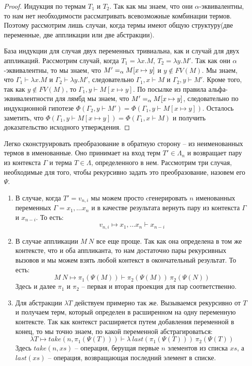 \begin{proof}
  Индукция по термам $T_{1}$ и $T_{2}$. Так как мы знаем, что они $\alpha$-эквивалентны, то нам нет необходимости рассматривать всевозможные комбинации термов. Поэтому рассмотрим лишь случаи, когда термы имеют общую структуру(две переменные, две аппликации или две абстракции).

  База индукции для случая двух переменных тривиальна, как и случай для двух аппликаций. Рассмотрим случай, когда $T_{1} = \lambda x.M$, $T_{2} = \lambda y.M'$. Так как они $\alpha$-эквивалентны, то мы знаем, что $M' =_{\alpha} M[x \mapsto y]$ и $y \notin FV(M)$. Мы знаем, что $\Gamma_{1} \vdash \lambda x.M$ и $\Gamma_{2} \vdash \lambda y.M'$, следовательно $\Gamma_{1}, x \vdash M$ и $\Gamma_{2}, y \vdash M'$. Кроме того, так как $y \notin FV(M)$, то $\Gamma_{1}, y \vdash M[x \mapsto y]$. По посылке из правила альфа-эквивалентности для лямбд мы знаем, что $M' =_{\alpha} M[x \mapsto y]$, следовательно по индукционной гипотезе $\Phi(\Gamma_{2}, y \vdash M') = \Phi(\Gamma_{1}, y \vdash M[x \mapsto y])$. Осталось заметить, что $\Phi(\Gamma_{1}, y \vdash M[x \mapsto y]) = \Phi(\Gamma_{1}, x \vdash M)$ и получить доказательство исходного утверждения.
\end{proof}

Легко сконструировать преобразование в обратную сторону -- из неименованных термов в именованные. Оно принимает на вход терм $T' \in \Lambda_{n}$ и возвращает пару из контекста $\Gamma$ и терма $T \in \Lambda$, определенного в нем. Рассмотрим три случая, необходимые для того, чтобы рекурсивно задать это преобразование, назовем его $\Psi$.

\begin{enumerate}
  \item В случае, когда $T' = v_{n, i}$ мы можем просто cгенерировать $n$ именованных переменных $\Gamma = x_{1}, \dots x_{n}$ и в качестве результата вернуть пару из контекста $\Gamma$ и $x_{n - i}$. То есть:
  $$ v_{n, i} \mapsto x_{1}, \dots x_{n} \vdash x_{n-i} $$

  \item В случае аппликации $M\ N$ все еще проще. Так как она определена в том же контексте, что и оба аппликанта, то нам достаточно пары рекурсивных вызовов и мы можем взять любой контекст в окончательный результат. То есть:
  $$ M\ N \mapsto \pi_{1}(\Psi(M)) \vdash \pi_{2}(\Psi(M))\ \pi_{2}(\Psi(N))$$
  Здесь и далее $\pi_{1}$ и $\pi_{2}$ -- первая и вторая проекция для пар соответственно.

  \item Для абстракции $\lambda T$ действуем примерно так же. Вызываемся рекурсивно от $T$ и получаем терм, который определен в расширенном на одну переменную контексте. Так как контекст расширяется путем добавления переменной в конец, то мы точно знаем, по какой переменной абстрагироваться:
  $$ \lambda T \mapsto take(n, \pi_{1}(\Psi(T))) \vdash \lambda\ last(\pi_{1}(\Psi(T)))\ \pi_{2}(\Psi(T)) $$
  Здесь $take(n, xs)$ -- операция, берущая первые $n$ элементов из списка $xs$, а $last(xs)$ -- операция, возвращающая последний элемент в списке.
\end{enumerate}

